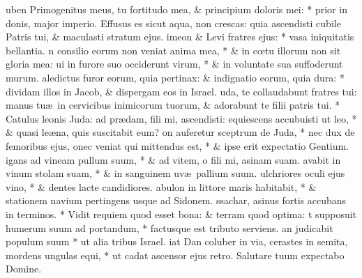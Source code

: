 \documentclass[letter,11pt]{book}
\begin{document}
\begin{multicols*}{2}
uben Primogenitus meus, tu fortitudo mea, \& principium doloris mei: * prior in donis, major imperio. Effusus es sicut aqua, non crescas: quia ascendisti cubile Patris tui, \& maculasti stratum ejus.
imeon \& Levi fratres ejus: * vasa iniquitatis bellantia.
n consilio eorum non veniat anima mea, * \& in c\oe tu illorum non sit gloria mea:
ui in furore suo occiderunt virum, * \& in voluntate sua suffoderunt murum.
aledictus furor eorum, quia pertinax: \& indignatio eorum, quia dura: * dividam illos in Jacob, \& dispergam eos in Israel.
uda, te collaudabunt fratres tui: manus tu\ae \ in cervicibus inimicorum tuorum, \& adorabunt te filii patris tui. * Catulus leonis Juda: ad pr\ae dam, fili mi, ascendisti:
equiescens accubuisti ut leo, * \& quasi le\ae na, quis suscitabit eum?
on auferetur sceptrum de Juda, * nec dux de femoribus ejus,
onec veniat qui mittendus est, * \& ipse erit expectatio Gentium.
igans ad vineam pullum suum, * \& ad vitem, o fili mi, asinam suam.
avabit in vinum stolam suam, * \& in sanguinem uv\ae \ pallium suum.
ulchriores oculi ejus vino, * \& dentes lacte candidiores.
abulon in littore maris habitabit, * \& stationem navium pertingens usque ad Sidonem.
ssachar, asinus fortis accubans in terminos. * Vidit requiem quod esset bona: \& terram quod optima:
t supposuit humerum suum ad portandum, * factusque est tributo serviens.
an judicabit populum suum * ut alia tribus Israel.
iat Dan coluber in via, cerastes in semita, mordens ungulas equi, * ut cadat ascensor ejus retro. Salutare tuum expectabo Domine.

\end{multicols*}
\end{document}
